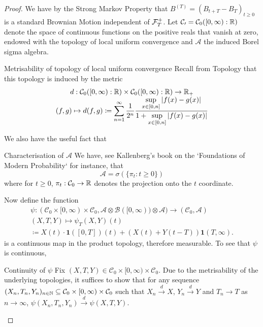 \documentclass{article}
\begin{document}
\begin{proof}
    We have by the Strong Markov Property that $B^{(T)} = (B_{t+T}-B_{T})_{t\geq 0}$ is a standard Brownian Motion independent of $ \mathcal{F}^{+}_{T}$. Let $ \mathcal{C_{0}} = \mathcal{C}_{0}([0,\infty):\mathbb{R})$ denote the space of continuous functions on the positive reals that vanish at zero, endowed with the topology of local uniform convergence and $  \mathcal{A}$ the induced Borel sigma algebra. 

   \begin{examplesblock}{Metrisability of topology of local uniform convergence}\label{aside: metrisability of local uniform topology}
 Recall from Topology that this topology is induced by the metric 
\[
	\begin{array}{cc}
    d:  \mathcal{C}_{0}([0,\infty):\mathbb{R})\times \mathcal{C}_{0}([0,\infty):\mathbb{R})\to \mathbb{R}_{+}\\ 
    (f,g)\mapsto d(f,g)\coloneqq \displaystyle\sum_{n=1}^{\infty} \frac{1}{2^n}\frac{ \displaystyle\sup_{x\in [0,n]}|f(x)-g(x)|}{1+ \displaystyle\sup_{x\in [0,n]}|f(x)-g(x)|}
\end{array}
\]
   \end{examplesblock} 

   We also have the useful fact that

   \begin{examplesblock}{Characterisation of $ \mathcal{A}$}\label{aside: sigma alg space of cont funcs }
   We have, see Kallenberg's book on the `Foundations of Modern Probability` for instance, that
   \[
	   \mathcal{A} = \sigma(\{\pi_{t}: t\geq 0\})
   \]
   where for $ t\geq 0$, $ \pi_{t}: \mathcal{C}_{0}\to \mathbb{R}$ denotes the projection onto the $ t$ coordinate.
   \end{examplesblock}

    Now define the function 
    \[
	    \begin{array}{cc}

\psi: (\mathcal{C}_{0}\times [0,\infty) \times \mathcal{C}_{0},  \mathcal{A}\otimes \mathcal{B}([0,\infty))\otimes \mathcal{A})\to (\mathcal{C}_{0}, \mathcal{A})\\ 
(X,T,Y)\mapsto \psi_{T}(X,Y)(t)\\ 
\coloneqq X(t)\cdot \mathbf{1}([0,T])(t)+(X(t)+Y(t-T)) \mathbf{1}(T, \infty).
    
\end{array}

        \]
    is a continuous map in the product topology, therefore measurable. To see that $ \psi$ is continuous, 
    \begin{examplesblock}{Continuity of $ \psi$}\label{aside: proof of continuity reflection map}
	    Fix $ (X,T,Y)\in \mathcal{C}_{0}\times [0,\infty) \times \mathcal{C}_{0}$. Due to the metrisability of the underlying topologies, it suffices to show that for any sequence $(X_{n}, T_{n}, Y_{n})_{n\in \mathbb{N}}\subseteq  \mathcal{C}_{0}\times [0,\infty)\times \mathcal{C}_{0}$ such that $ X_{n}\stackrel{d}{\longrightarrow}X$, $Y_{n}\stackrel{d}{\longrightarrow}Y $ and $ T_{n}\to T$ as $ n\to \infty$, $\psi(X_{n}, T_{n}, Y_{n} ) \stackrel{d}{\longrightarrow} \psi(X,T,Y) $.\\ 


\end{examplesblock}
\end{proof}
\end{document}
